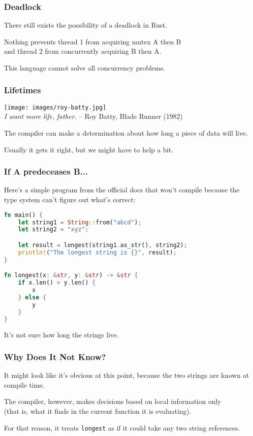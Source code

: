\begin{frame}
\frametitle{Deadlock}

There still exists the possibility of a deadlock in Rust.

Nothing prevents thread 1 from acquiring mutex A then B \\
\qquad and thread 2 from concurrently acquiring B then A. 

This language cannot solve all concurrency problems.

\end{frame}


\begin{frame}
\frametitle{Lifetimes}
\begin{center}
	\texttt{[image: images/roy-batty.jpg]}\\
	\hfill \textit{I want more life, father.} -- Roy Batty, Blade Runner (1982)
\end{center}

The compiler can make a determination about how long a piece of data will live.

Usually it gets it right, but we might have to help a bit.

\end{frame}


\begin{frame}[fragile]
\frametitle{If A predeceases B...}


Here's a simple program from the official docs that won't compile because the type system can't figure out what's correct:

\begin{lstlisting}[language=Rust]
fn main() {
    let string1 = String::from("abcd");
    let string2 = "xyz";

    let result = longest(string1.as_str(), string2);
    println!("The longest string is {}", result);
}

fn longest(x: &str, y: &str) -> &str {
    if x.len() > y.len() {
        x
    } else {
        y
    }
}
\end{lstlisting}

It's not sure how long the strings live.

\end{frame}

\begin{frame}
\frametitle{Why Does It Not Know?}

It might look like it's obvious at this point, because the two strings are known at compile time. 

The compiler, however, makes decisions based on local information only\\
\qquad (that is, what it finds in the current function it is evaluating). 

For that reason, it treats \texttt{longest} as if it could take any two string references.

\end{frame}

